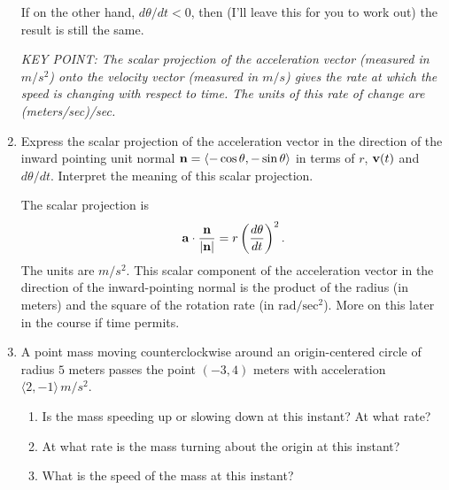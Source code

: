 \documentclass{ximera}
\begin{document}
\begin{question}
\begin{enumerate}
\begin{expandable}
If on the other hand, $d\theta/dt < 0$, then (I'll leave this for you to work out) the result is still the same.

\emph{KEY POINT: The scalar projection of the acceleration vector (measured in $m/s^2$) onto the velocity vector (measured in $m/s$) gives the rate at which the speed is changing with respect to time. The units of this rate of change are (meters/sec)/sec.
} 

\end{expandable}

\item Express the scalar projection of the acceleration vector in the direction of the inward pointing unit normal ${\bf n} = \langle -\cos\theta, -\sin\theta \rangle$ in terms of $r$, ${\bf v}(t)$ and $d\theta/dt$. Interpret the meaning of this scalar projection.

\begin{expandable}
The scalar projection is
\[
   {\bf a}\cdot \frac{{\bf n}}{|{\bf n|}} =  r \left( \frac{d\theta}{dt} \right)^2 .
\]
The units are $m/s^2$. This scalar component of the acceleration vector in the direction of the inward-pointing normal is the product of the radius (in meters) and the square of the rotation rate (in $\text{rad}/\text{sec}^2$). More on this later in the course if time permits.
\end{expandable}

\item A point mass moving counterclockwise around an origin-centered circle of radius $5$ meters passes the point $(-3,4)$ meters with acceleration $\langle 2, -1\rangle \, m/s^2$.  

\begin{enumerate}
\item Is the mass speeding up or slowing down at this instant? At what rate?

\item At what rate is the mass turning about the origin at this instant?

\item What is the speed of the mass at this instant?

\begin{freeResponse}
\end{freeResponse}
\end{enumerate}

\end{enumerate}

\end{question}
\end{document}
